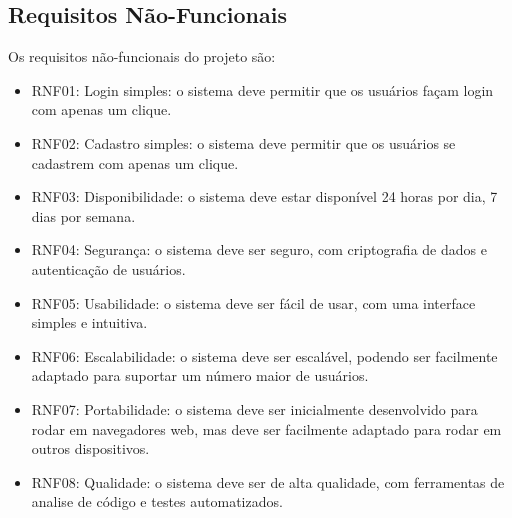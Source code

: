 \subsection{Requisitos Não-Funcionais}

Os requisitos não-funcionais do projeto são:

\begin{itemize}
    \item RNF01: Login simples: o sistema deve permitir que os usuários façam login com apenas um clique.
    \item RNF02: Cadastro simples: o sistema deve permitir que os usuários se cadastrem com apenas um clique.
    \item RNF03: Disponibilidade: o sistema deve estar disponível 24 horas por dia, 7 dias por semana.
    \item RNF04: Segurança: o sistema deve ser seguro, com criptografia de dados e autenticação de usuários.
    \item RNF05: Usabilidade: o sistema deve ser fácil de usar, com uma interface simples e intuitiva.
    \item RNF06: Escalabilidade: o sistema deve ser escalável, podendo ser facilmente adaptado para suportar um número maior de usuários.
    \item RNF07: Portabilidade: o sistema deve ser inicialmente desenvolvido para rodar em navegadores web, mas deve ser facilmente adaptado para rodar em outros dispositivos.
    \item RNF08: Qualidade: o sistema deve ser de alta qualidade, com ferramentas de analise de código e testes automatizados.
\end{itemize}